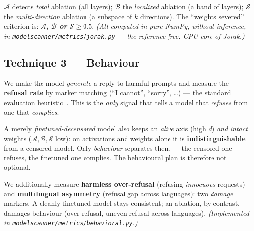 \documentclass[11pt,a4paper]{article}
\theoremstyle{definition}
\theoremstyle{plain}
\begin{document}
\begin{intuition}
$\mathcal{A}$ detects \emph{total} ablation (all layers); $\mathcal{B}$ the
\emph{localized} ablation (a band of layers); $\mathcal{S}$ the
\emph{multi-direction} ablation (a subspace of $k$ directions). The
``weights severed'' criterion is: \textbf{$\mathcal{A}$, $\mathcal{B}$ \emph{or}
$\mathcal{S}\ge 0.5$}. \emph{(All computed in pure NumPy, without inference, in
\texttt{modelscanner/metrics/jorak.py} — the \emph{reference-free}, CPU core of Jorak.)}
\end{intuition}

\subsection{Technique 3 — Behaviour}\label{sec:behav}
We make the model \emph{generate} a reply to harmful prompts and measure the
\textbf{refusal rate} by marker matching (``I cannot'', ``sorry'', \dots) — the
standard evaluation heuristic~\cite{zou2023}. This is the \emph{only} signal that
tells a model that \emph{refuses} from one that \emph{complies}.

\begin{intuition}
A merely \emph{finetuned-decensored} model also keeps an \emph{alive} axis (high $d$)
\emph{and} \emph{intact} weights ($\mathcal{A},\mathcal{B},\mathcal{S}$ low): on
activations and weights alone it is \textbf{indistinguishable} from a censored model.
Only \emph{behaviour} separates them — the censored one refuses, the finetuned one
complies. The behavioural plan is therefore not optional.
\end{intuition}

\noindent We additionally measure \textbf{harmless over-refusal} (refusing
\emph{innocuous} requests) and \textbf{multilingual asymmetry} (refusal gap across
languages): two \emph{damage} markers. A cleanly finetuned model stays consistent; an
ablation, by contrast, damages behaviour (over-refusal, uneven refusal across
languages). \emph{(Implemented in \texttt{modelscanner/metrics/behavioral.py}.)}
\end{document}
